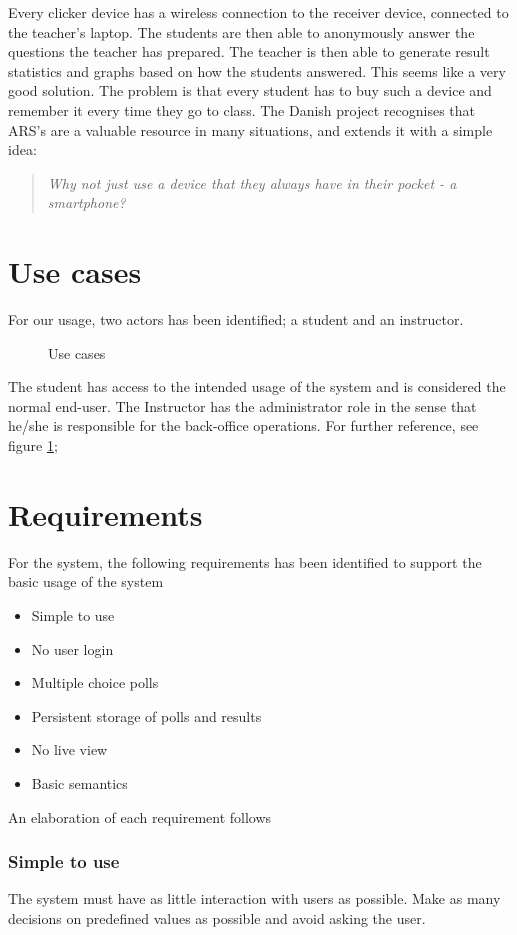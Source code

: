 \documentclass{acm_proc_article-sp}
\begin{document}
Every clicker device has a wireless connection to the receiver device, connected to the teacher’s laptop. The students are then able to anonymously answer the questions the teacher has prepared. The teacher is then able to generate result statistics and graphs based on how the students answered. This seems like a very good solution. The problem is that every student has to buy such a device and remember it every time they go to class. The Danish project recognises that ARS’s are a valuable resource in many situations, and extends it with a simple idea:

\begin{quote}
\textit{Why not just use a device that they always have in their pocket - a smartphone?}
\end{quote}


%


\section{Use cases}
For our usage, two actors has been identified; a student and an instructor.
\begin{figure}[h]
\centering
{}
\caption{Use cases}
\label{fig:use_cases}
\end{figure}
The student has access to the intended usage of the system and is considered the normal end-user. The Instructor has the administrator role in the sense that he/she is responsible for the back-office operations. For further reference, see figure \ref{fig:use_cases};

\section{Requirements}
For the system, the following requirements has been identified to support the basic usage of the system
\begin{itemize}
  \item Simple to use
  \item No user login
  \item Multiple choice polls
  \item Persistent storage of polls and results
  \item No live view
  \item Basic semantics
\end{itemize}
An elaboration of each requirement follows
\subsubsection*{Simple to use}
The system must have as little interaction with users as possible. Make as many decisions on predefined values as possible and avoid asking the user.
\end{document}
